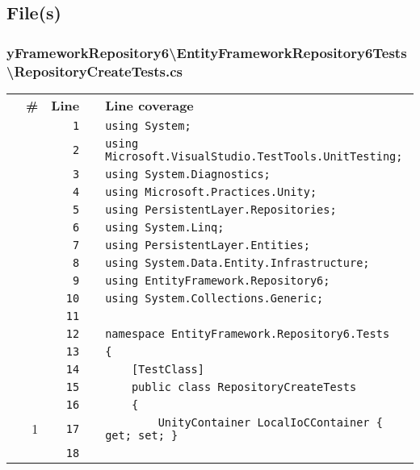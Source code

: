 \documentclass[a4paper,10pt]{article}
\begin{document}
\subsection{File(s)}
\subsubsection{yFrameworkRepository6\textbackslash EntityFrameworkRepository6Tests\textbackslash RepositoryCreateTests.cs}
\begin{longtable}[l]{lrrll}
\textbf{} & \textbf{\#} & \textbf{Line} & \textbf{} & \textbf{Line coverage}\\
\cellcolor{gray} &  & \verb~1~ & & \verb~using System;~\\
\cellcolor{gray} &  & \verb~2~ & & \verb~using Microsoft.VisualStudio.TestTools.UnitTesting;~\\
\cellcolor{gray} &  & \verb~3~ & & \verb~using System.Diagnostics;~\\
\cellcolor{gray} &  & \verb~4~ & & \verb~using Microsoft.Practices.Unity;~\\
\cellcolor{gray} &  & \verb~5~ & & \verb~using PersistentLayer.Repositories;~\\
\cellcolor{gray} &  & \verb~6~ & & \verb~using System.Linq;~\\
\cellcolor{gray} &  & \verb~7~ & & \verb~using PersistentLayer.Entities;~\\
\cellcolor{gray} &  & \verb~8~ & & \verb~using System.Data.Entity.Infrastructure;~\\
\cellcolor{gray} &  & \verb~9~ & & \verb~using EntityFramework.Repository6;~\\
\cellcolor{gray} &  & \verb~10~ & & \verb~using System.Collections.Generic;~\\
\cellcolor{gray} &  & \verb~11~ & & \verb~~\\
\cellcolor{gray} &  & \verb~12~ & & \verb~namespace EntityFramework.Repository6.Tests~\\
\cellcolor{gray} &  & \verb~13~ & & \verb~{~\\
\cellcolor{gray} &  & \verb~14~ & & \verb~    [TestClass]~\\
\cellcolor{gray} &  & \verb~15~ & & \verb~    public class RepositoryCreateTests~\\
\cellcolor{gray} &  & \verb~16~ & & \verb~    {~\\
\cellcolor{green} & 1 & \verb~17~ & & \verb~        UnityContainer LocalIoCContainer { get; set; }~\\
\cellcolor{gray} &  & \verb~18~ & & \verb~~\\

\end{longtable}
\end{document}

